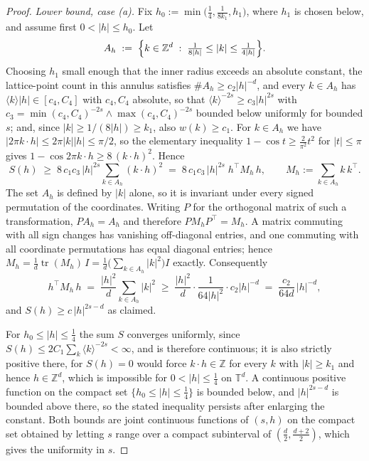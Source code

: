 \documentclass[pdflatex,sn-mathphys,Numbered]{sn-jnl}
\theoremstyle{thmstyleone}%
\theoremstyle{thmstyletwo}%
\theoremstyle{thmstylethree}%
\newcommand{\ZZ}{\mathbb{Z}}
\newcommand{\TT}{\mathbb{T}}
\begin{document}
\begin{appendices}
\begin{proof}
\emph{Lower bound, case \textup{(a)}.} Fix $h_0 := \min\bigl(\tfrac14,\tfrac{1}{8k_1},h_1\bigr)$,
where $h_1$ is chosen below, and assume first $0<|h| \leq h_0$. Let
\[
    A_h \;:=\; \Bigl\{k \in \ZZ^d \;:\; \tfrac{1}{8|h|} \leq |k| \leq \tfrac{1}{4|h|}\Bigr\} .
\]
Choosing $h_1$ small enough that the inner radius exceeds an absolute constant,
the lattice-point count in this annulus satisfies $\#A_h \geq c_2|h|^{-d}$, and
every $k \in A_h$ has $\langle k\rangle|h| \in [c_4,C_4]$ with $c_4,C_4$
absolute, so that $\langle k\rangle^{-2s} \geq c_3|h|^{2s}$ with
$c_3 = \min(c_4,C_4)^{-2s}\wedge\max(c_4,C_4)^{-2s}$ bounded below uniformly for
bounded $s$; and, since
$|k| \geq 1/(8|h|) \geq k_1$, also $w(k) \geq c_1$. For $k \in A_h$ we have
$|2\pi k\cdot h| \leq 2\pi|k||h| \leq \pi/2$, so the elementary inequality
$1-\cos t \geq \tfrac{2}{\pi^2}t^2$ for $|t| \leq \pi$ gives
$1-\cos 2\pi k\cdot h \geq 8\,(k\cdot h)^2$. Hence
\[
    S(h) \;\geq\; 8\,c_1c_3\,|h|^{2s} \sum_{k \in A_h}(k\cdot h)^2
    \;=\; 8\,c_1c_3\,|h|^{2s}\; h^{\top}\!M_h\,h ,
    \qquad M_h := \sum_{k\in A_h}k\,k^{\top} .
\]
The set $A_h$ is defined by $|k|$ alone, so it is invariant under every signed
permutation of the coordinates. Writing $P$ for the orthogonal matrix of such a
transformation, $PA_h = A_h$ and therefore $PM_hP^{\top} = M_h$. A matrix
commuting with all sign changes has vanishing off-diagonal entries, and one
commuting with all coordinate permutations has equal diagonal entries; hence
$M_h = \tfrac1d\operatorname{tr}(M_h)\,I = \tfrac1d\bigl(\sum_{k\in A_h}|k|^2\bigr)I$
exactly. Consequently
\[
    h^{\top}M_h\,h \;=\; \frac{|h|^2}{d}\sum_{k\in A_h}|k|^2
    \;\geq\; \frac{|h|^2}{d}\cdot\frac{1}{64|h|^2}\cdot c_2|h|^{-d}
    \;=\; \frac{c_2}{64d}\,|h|^{-d} ,
\]
and $S(h) \geq c\,|h|^{2s-d}$ as claimed.

For $h_0 \leq |h| \leq \tfrac14$ the sum $S$ converges uniformly, since
$S(h) \leq 2C_1\sum_k\langle k\rangle^{-2s} < \infty$, and is therefore
continuous; it is also strictly positive there, for $S(h)=0$ would force
$k\cdot h \in \ZZ$ for every $k$ with $|k| \geq k_1$ and hence $h \in \ZZ^d$,
which is impossible for $0<|h|\leq\frac14$ on $\TT^d$. A continuous positive
function on the compact set $\{h_0 \leq |h| \leq \frac14\}$ is bounded below,
and $|h|^{2s-d}$ is bounded above there, so the stated inequality persists after
enlarging the constant. Both bounds are joint continuous functions of $(s,h)$ on
the compact set obtained by letting $s$ range over a compact subinterval of
$(\tfrac d2,\tfrac{d+2}2)$, which gives the uniformity in $s$.
\end{proof}


\end{appendices}
\end{document}
